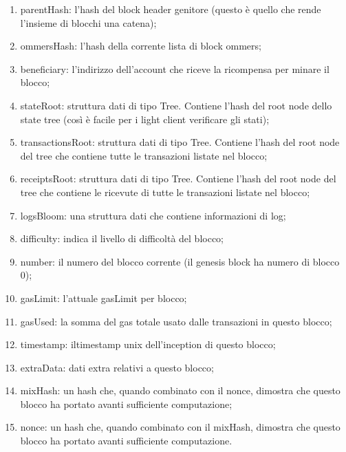 \begin{enumerate}
	\item parentHash: l'\gls{hash} del block header genitore (questo è quello che rende l'insieme di blocchi una catena);
	\item ommersHash: l'hash della corrente lista di block ommers;
	\item beneficiary: l'indirizzo dell'account che riceve la ricompensa per minare il blocco;
	\item stateRoot: struttura dati di tipo Tree. Contiene l'hash del root node dello state tree (così è facile per i light client verificare gli stati);
	\item transactionsRoot: struttura dati di tipo Tree. Contiene l'hash del root node del tree che contiene tutte le transazioni listate nel blocco;
	\item receiptsRoot: struttura dati di tipo Tree. Contiene l'hash del root node del tree che contiene le ricevute di tutte le transazioni listate nel blocco;
	\item logsBloom: una struttura dati che contiene informazioni di log;
	\item difficulty: indica il livello di difficoltà del blocco;
	\item number: il numero del blocco corrente (il genesis block ha numero di blocco 0);
	\item gasLimit: l'attuale gasLimit per blocco;
	\item gasUsed: la somma del gas totale usato dalle transazioni in questo blocco;
	\item timestamp: iltimestamp unix dell'inception di questo blocco;
	\item extraData: dati extra relativi a questo blocco;
	\item mixHash: un hash che, quando combinato con il nonce, dimostra che questo blocco ha portato avanti sufficiente computazione;
	\item nonce: un hash che, quando combinato con il mixHash, dimostra che questo blocco ha portato avanti sufficiente computazione.
\end{enumerate}%
